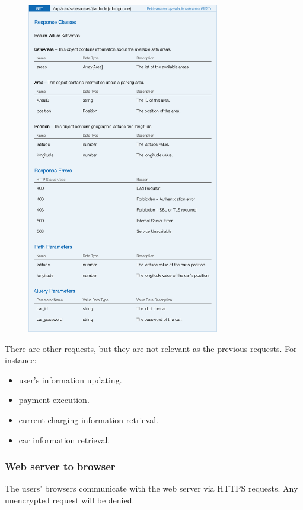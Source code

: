 \begin{figure}[H]
	\noindent
    	\centering
    	\includegraphics[height=550px, keepaspectratio]{apitables/APISafeAreas.png}
    	\label{fig:api-safe-areas}
\end{figure}


There are other requests, but they are not relevant as the previous requests. For instance:

\begin{itemize}
	\item user's information updating.
	\item payment execution.
	\item current charging information retrieval.
	\item car information retrieval.
\end{itemize}

\subsubsection{Web server to browser}

The users' browsers communicate with the web server via HTTPS requests. Any unencrypted request will be denied.


